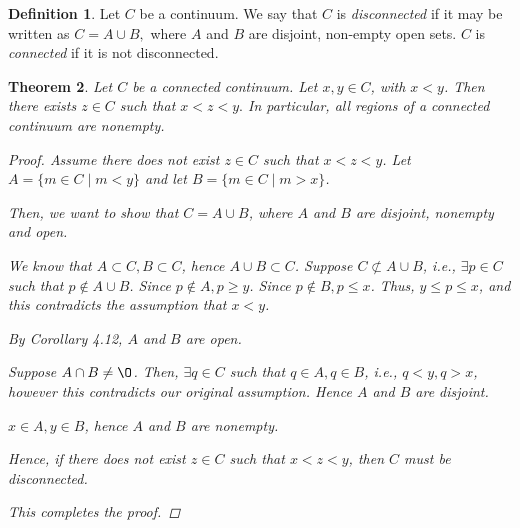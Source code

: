 \documentclass[11pt]{article}
\renewcommand{\emptyset}{\O}
\renewcommand{\_}[1]{\underline{ #1 }}
\newtheorem{theorem}{Theorem}[section]
\theoremstyle{definition}
\newtheorem{definition}[theorem]{Definition}
\numberwithin{equation}{subsection}
\begin{document}
\begin{definition}
Let $C$ be a continuum.  We say that $C$ is {\it disconnected} if it may be written as $C=A\cup B,$ where $A$ and $B$ are disjoint, non-empty open sets.  $C$ is {\it connected} if it is not disconnected.


\end{definition} 

\begin{theorem}\label{thm:nonemptyregions} Let $C$ be a connected continuum. Let $x, y \in C$,  with $x < y$. Then there exists $z \in C$ such that $x<z<y.$  In particular, all regions of a connected continuum are nonempty.
\begin{proof}
Assume there does not exist $z \in C$ such that $x<z<y$. Let $A = \{m \in C \mid m <y\}$ and let $B = \{m \in C \mid m >x\}$.

Then, we want to show that $C = A \cup B$, where $A$ and $B$ are disjoint, nonempty and open.

We know that $A \subset C, B \subset C$, hence $A \cup B \subset C$. Suppose $C \not \subset A \cup B$, i.e., $\exists p \in C$ such that $p \notin A \cup B$. Since $p \notin A, p \geq y$. Since $p \notin B, p \leq x$. Thus, $y \leq p \leq x$, and this contradicts the assumption that $x < y$.

By Corollary 4.12, $A$ and $B$ are open.

Suppose $A \cap B \neq \emptyset$. Then, $\exists q \in C$ such that $q \in A, q \in B$, i.e., $q<y, q>x$, however this contradicts our original assumption. Hence $A$ and $B$ are disjoint.

$x \in A, y \in B$, hence $A$ and $B$ are nonempty.

Hence, if there does not exist $z \in C$ such that $x<z<y$, then $C$ must be disconnected.

This completes the proof.

\renewcommand\qedsymbol{QED}
\end{proof}
\end{theorem} 
\end{document}
